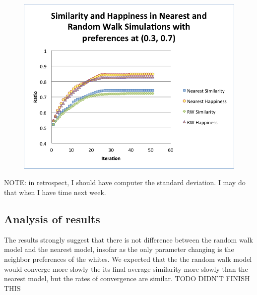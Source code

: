 \documentclass[11pt,twoside]{amsart}
\theoremstyle{theorem}
\theoremstyle{definition}
\theoremstyle{remark}
\begin{document}
    \begin{figure}
        \includegraphics[scale=0.35]{3_7.png}
    \end{figure}

NOTE: in retrospect, I should have computer the standard deviation. I may do that when I have time next week.

\subsection{Analysis of results}
The results strongly suggest that there is not difference between the random walk model and the nearest model, insofar as the only parameter changing is the neighbor preferences of the whites. 
We expected that the the random walk model would converge more slowly the its final average similarity more slowly than the nearest model, but the rates of convergence are similar. 
TODO DIDN'T FINISH THIS

\end{document}
